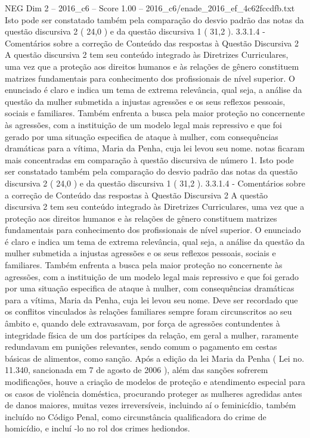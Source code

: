 \begin{textsample}{NEG Dim 2 – 2016\_c6 – Score 1.00 – 2016\_c6/enade\_2016\_ef\_4c62fccdfb.txt}
Isto pode ser constatado também pela comparação do desvio padrão das notas da questão discursiva 2 ( 24,0 ) e da questão discursiva 1 ( 31,2 ). 3.3.1.4 - Comentários sobre a correção de Conteúdo das respostas à Questão Discursiva 2 A questão discursiva 2 tem seu conteúdo integrado às Diretrizes Curriculares, uma vez que a proteção aos direitos humanos e às relações de gênero constituem matrizes fundamentais para conhecimento dos profissionais de nível superior.
O enunciado é claro e indica um tema de extrema relevância, qual seja, a análise da questão da mulher submetida a injustas agressões e os seus reflexos pessoais, sociais e familiares.
Também enfrenta a busca pela maior proteção no concernente às agressões, com a instituição de um modelo legal mais repressivo e que foi gerado por uma situação especifica de ataque à mulher, com consequências dramáticas para a vítima, Maria da Penha, cuja lei levou seu nome. notas ficaram mais concentradas em comparação à questão discursiva de número 1.
Isto pode ser constatado também pela comparação do desvio padrão das notas da questão discursiva 2 ( 24,0 ) e da questão discursiva 1 ( 31,2 ). 3.3.1.4 - Comentários sobre a correção de Conteúdo das respostas à Questão Discursiva 2 A questão discursiva 2 tem seu conteúdo integrado às Diretrizes Curriculares, uma vez que a proteção aos direitos humanos e às relações de gênero constituem matrizes fundamentais para conhecimento dos profissionais de nível superior.
O enunciado é claro e indica um tema de extrema relevância, qual seja, a análise da questão da mulher submetida a injustas agressões e os seus reflexos pessoais, sociais e familiares.
Também enfrenta a busca pela maior proteção no concernente às agressões, com a instituição de um modelo legal mais repressivo e que foi gerado por uma situação especifica de ataque à mulher, com consequências dramáticas para a vítima, Maria da Penha, cuja lei levou seu nome.
Deve ser recordado que os conflitos vinculados às relações familiares sempre foram circunscritos ao seu âmbito e, quando dele extravasavam, por força de agressões contundentes à integridade física de um dos partícipes da relação, em geral a mulher, raramente redundavam em punições relevantes, sendo comum o pagamento em cestas básicas de alimentos, como sanção.
Após a edição da lei Maria da Penha ( Lei no. 11.340, sancionada em 7 de agosto de 2006 ), além das sanções sofrerem modificações, houve a criação de modelos de proteção e atendimento especial para os casos de violência doméstica, procurando proteger as mulheres agredidas antes de danos maiores, muitas vezes irreversíveis, incluindo aí o feminicídio, também incluído no Código Penal, como circunstância qualificadora do crime de homicídio, e incluí -lo no rol dos crimes hediondos.

\end{textsample}
